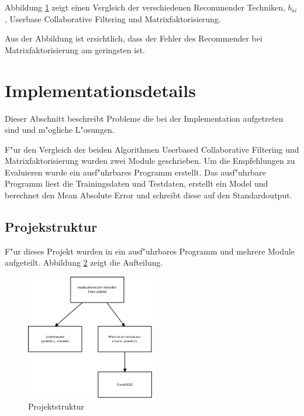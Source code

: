 \documentclass[a4paper, 12pt]{article}
\begin{document}
Abbildung \ref{fig:compare} zeigt einen Vergleich der verschiedenen Recommender Techniken, $b_{ui}$, Userbase Collaborative Filtering und Matrixfaktorisierung.

\begin{figure}
\centering
\label{fig:compare}
\caption{}
\end{figure}

Aus der Abbildung ist ersichtlich, dass der Fehler des Recommender bei Matrixfaktorisierung am geringsten ist.

\section{Implementationsdetails}
\label{sec:ram}

Dieser Abschnitt beschreibt Probleme die bei der Implementation aufgetreten sind und m"ogliche L"osungen.

F"ur den Vergleich der beiden Algorithmen Userbased Collaborative Filtering und Matrixfaktorisierung wurden zwei Module geschrieben. Um die Empfehlungen zu Evaluieren wurde ein ausf"uhrbares Programm erstellt. Das ausf"uhrbare Programm liest die Trainingsdaten und Testdaten, erstellt ein Model und berechnet den Mean Absolute Error und schreibt diese auf den Standardoutput.

\subsection{Projekstruktur}
\label{sec:structur}

F"ur dieses Projekt wurden in ein ausf"uhrbares Programm und mehrere Module aufgeteilt. Abbildung \ref{fig:structur} zeigt die Aufteilung.

\begin{figure}
  \centering
      \includegraphics[width=0.5\textwidth]{structur}
  \caption{Projektstruktur}
  \label{fig:structur}
\end{figure}
\end{document}
